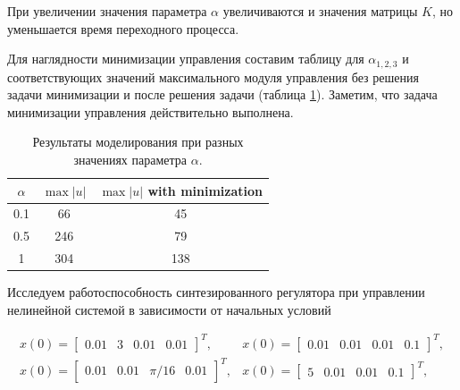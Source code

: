 \newpage
При увеличении значения параметра $\alpha$ увеличиваются и значения матрицы $K$, но уменьшается время переходного процесса.

Для наглядности минимизации управления составим таблицу для $\alpha_{1,2,3}$ и соответствующих значений максимального модуля управления без решения задачи минимизации и после решения задачи (таблица \ref{4_tab_3}). Заметим, что задача минимизации управления действительно выполнена.

\begin{table}[h]
\centering
\caption{Результаты моделирования при разных значениях параметра $\alpha$.}
\label{4_tab_3}
\begin{tabular}{ccc}
\toprule
$\alpha$ & $\max |u|$ & $\max |u|$ with minimization\\
\midrule
0.1  &  66  &  45  \\
0.5  &  246  &  79   \\
1 &  304  &  138 \\ 
\bottomrule
\end{tabular}
\end{table}


Исследуем работоспособность синтезированного регулятора при управлении нелинейной системой в зависимости от начальных условий


\begin{equation*}
  \begin{matrix}
      x(0) = \begin{bmatrix}
          0.01 & 3 & 0.01 & 0.01
      \end{bmatrix}^T, & x(0) = \begin{bmatrix}
          0.01 & 0.01 & 0.01 & 0.1
      \end{bmatrix}^T,\\
      x(0) = \begin{bmatrix}
          0.01 & 0.01 & \pi /16 & 0.01
      \end{bmatrix}^T, & x(0) = \begin{bmatrix}
          5 & 0.01 & 0.01 & 0.1
      \end{bmatrix}^T,\\ 
 \end{matrix}
\end{equation*}


